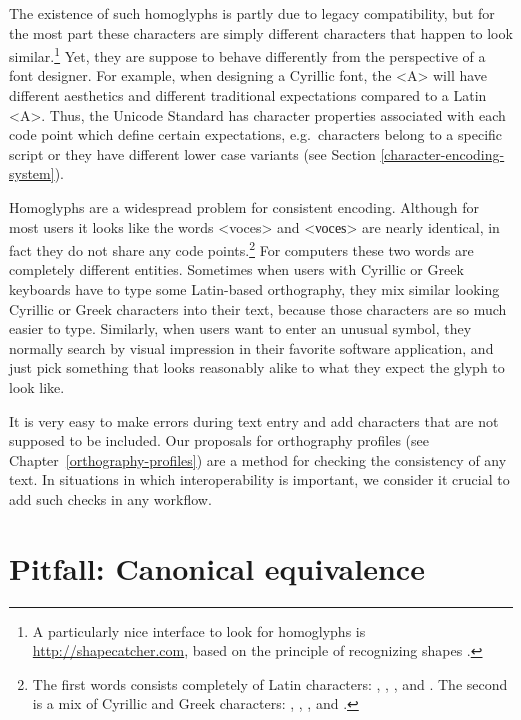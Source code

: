 The existence of such homoglyphs is partly due to legacy compatibility, but for
the most part these characters are simply different characters that happen to
look similar.\footnote{A particularly nice interface to look for homoglyphs is
\url{http://shapecatcher.com}, based on the principle of recognizing shapes
\citep{Belongie2002}.} Yet, they are suppose to behave differently from the
perspective of a font designer. For example, when designing a Cyrillic font, the
<A> will have different aesthetics and different traditional expectations
compared to a Latin <A>. Thus, the Unicode Standard has character properties 
associated with each code point which define certain expectations, e.g.\ characters 
belong to a specific script or they have different lower case variants (see 
Section \ref{character-encoding-system}).

Homoglyphs are a widespread problem for consistent encoding. Although for
most users it looks like the words <voces> and <νοсеѕ> are nearly identical, in 
fact they do not share any code points.\footnote{The first words
consists completely of Latin characters: , ,
,  and . The second is a mix of Cyrillic
and Greek characters: , , , 
and .} For computers these two words are completely different
entities. Sometimes when users with Cyrillic or Greek keyboards have to type
some Latin-based orthography, they mix similar looking Cyrillic or Greek
characters into their text, because those characters are so much easier to type.
Similarly, when users want to enter an unusual symbol, they normally search by
visual impression in their favorite software application, and just pick
something that looks reasonably alike to what they expect the glyph to look
like.

It is very easy to make errors during text entry and add characters that are 
not supposed to be included. Our proposals for orthography profiles (see
Chapter~\ref{orthography-profiles}) are a method for checking the consistency of 
any text. In situations in which interoperability is important, we consider it 
crucial to add such checks in any workflow.

\section{Pitfall: Canonical equivalence}
\label{pitfall-canonical-equivalence}

